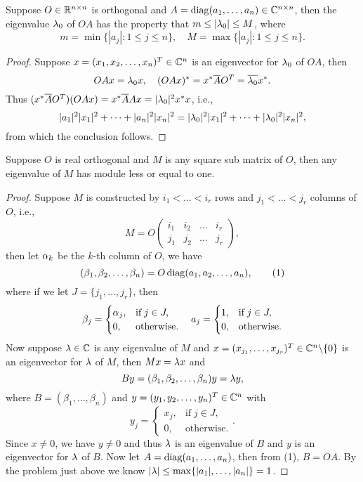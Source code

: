 \begin{pro}%
	Suppose $O\in \mathbb{R}^{n\times n}$ is orthogonal and $A=\operatorname*{diag}(a_1,\dots,a_n)\in\mathbb{C}^{n\times n}$, then the eigenvalue $\lambda_0$ of $OA$ has the property that $m\leq |\lambda_0|\leq M$, where
	\[m=\min\{|a_j|\colon 1\leq j\leq n\},\quad M=\max\{|a_j|\colon 1\leq j\leq n\}.\]
\end{pro}
\begin{proof}
	Suppose $x=(x_1,x_2,\dots,x_n)^T\in \mathbb{C}^n$ is an eigenvector for $\lambda_0$ of $OA$, then 
	\[OAx=\lambda_0 x,\quad (OAx)^*=x^*\overline{A} O^T=\overline{\lambda_0} x^*.\]
	Thus $(x^*\overline{A} O^T)(OAx)=x^*\overline{A}Ax=|\lambda_0|^2x^*x$, i.e.,
	\[|a_1|^2|x_1|^2+\dots+|a_n|^2|x_n|^2=|\lambda_0|^2|x_1|^2+\dots+|\lambda_0|^2|x_n|^2,\]
	from which the conclusion follows.
\end{proof}

\begin{pro}%
	Suppose $O$ is real orthogonal and $M$ is any square sub matrix of $O$, then any eigenvalue of $M$ has module less or equal to one.
\end{pro}
\begin{proof}
	Suppose $M$ is constructed by $i_1<\dots<i_r$ rows and $j_1<\dots<j_r$ columns of $O$, i.e.,
	\[M=O\begin{pmatrix} i_1 &i_2 &\dots &i_r\\
	j_1 & j_2 & \dots & j_r\end{pmatrix},\]
	then let $\alpha_k$ be the $k$-th column of $O$, we have
	\[(\beta_1,\beta_2,\dots,\beta_n)=O\operatorname*{diag}(a_1,a_2,\dots,a_n),\tag{1}\]
	where if we let $J=\{j_1,\dots,j_r\}$, then 
	\[\beta_j=\begin{cases}
	\alpha_j,&\mbox{if}\;j\in J,\\
	0,&\mbox{otherwise}.\end{cases}\quad
	a_j=\begin{cases}
	1,&\mbox{if}\; j\in J,\\
	0,&\mbox{otherwise}.\end{cases}\] 
	Now suppose $\lambda\in \mathbb{C}$ is any eigenvalue of $M$ and $x=(x_{j_1},\dots,x_{j_r})^T\in \mathbb{C}^n\backslash\{0\}$ is an eigenvector for $\lambda$ of $M$, then $Mx=\lambda x$ and
	\[By=(\beta_1,\beta_2,\dots,\beta_n)y=\lambda y,\]
	where $B=(\beta_1,\dots,\beta_n)$ and $y=(y_1,y_2,\dots,y_n)^T\in \mathbb{C}^n$ with
	\[y_j=\begin{cases}
	x_j,&\mbox{if}\; j\in J,\\
	0,&\mbox{otherwise}.\end{cases}.\]
	Since $x\neq 0$, we have $y\neq 0$ and thus $\lambda$ is an eigenvalue of $B$ and $y$ is an eigenvector for $\lambda$ of $B$. Now let $A=\operatorname*{diag}(a_1,\dots,a_n)$, then from (1), $B=OA$. By the problem just above we know $|\lambda|\leq \max\{|a_1|,\dots,|a_n|\}=1$. 
\end{proof}

